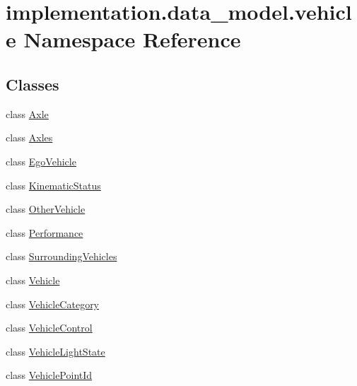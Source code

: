 \hypertarget{namespaceimplementation_1_1data__model_1_1vehicle}{}\section{implementation.\+data\+\_\+model.\+vehicle Namespace Reference}
\label{namespaceimplementation_1_1data__model_1_1vehicle}
\subsection*{Classes}
\begin{DoxyCompactItemize}
\item 
class \hyperlink{classimplementation_1_1data__model_1_1vehicle_1_1_axle}{Axle}
\item 
class \hyperlink{classimplementation_1_1data__model_1_1vehicle_1_1_axles}{Axles}
\item 
class \hyperlink{classimplementation_1_1data__model_1_1vehicle_1_1_ego_vehicle}{Ego\+Vehicle}
\item 
class \hyperlink{classimplementation_1_1data__model_1_1vehicle_1_1_kinematic_status}{Kinematic\+Status}
\item 
class \hyperlink{classimplementation_1_1data__model_1_1vehicle_1_1_other_vehicle}{Other\+Vehicle}
\item 
class \hyperlink{classimplementation_1_1data__model_1_1vehicle_1_1_performance}{Performance}
\item 
class \hyperlink{classimplementation_1_1data__model_1_1vehicle_1_1_surrounding_vehicles}{Surrounding\+Vehicles}
\item 
class \hyperlink{classimplementation_1_1data__model_1_1vehicle_1_1_vehicle}{Vehicle}
\item 
class \hyperlink{classimplementation_1_1data__model_1_1vehicle_1_1_vehicle_category}{Vehicle\+Category}
\item 
class \hyperlink{classimplementation_1_1data__model_1_1vehicle_1_1_vehicle_control}{Vehicle\+Control}
\item 
class \hyperlink{classimplementation_1_1data__model_1_1vehicle_1_1_vehicle_light_state}{Vehicle\+Light\+State}
\item 
class \hyperlink{classimplementation_1_1data__model_1_1vehicle_1_1_vehicle_point_id}{Vehicle\+Point\+Id}
\end{DoxyCompactItemize}
